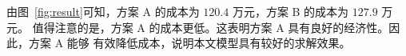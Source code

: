 由图~\ref{fig:result}可知，方案 A 的成本为 $120.4$ 万元，方案 B 的成本为 $127.9$ 万元。
值得注意的是，方案 A 的成本更低。这表明方案 A 具有良好的经济性。因此，方案 A 能够
有效降低成本，说明本文模型具有较好的求解效果。


